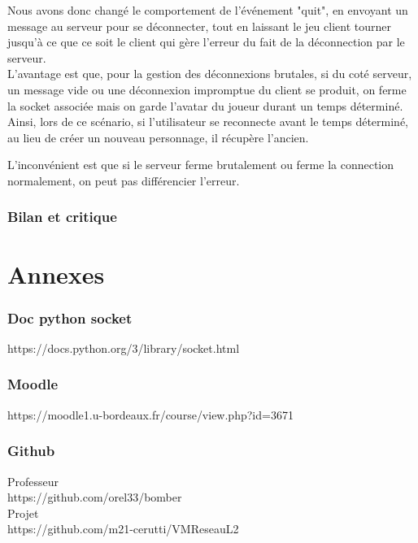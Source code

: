 \documentclass[a4paper]{article}
\begin{document}
		Nous avons donc changé le comportement de l'événement "quit", en envoyant un message au serveur pour se déconnecter, tout en laissant le jeu client tourner jusqu'à ce que ce soit le client qui gère l'erreur du fait de la déconnection par le serveur.
		\\
		L'avantage est que, pour la gestion des déconnexions brutales, si du coté serveur, un message vide ou une déconnexion impromptue du client se produit, on ferme la socket associée mais on garde l'avatar du joueur durant un temps déterminé. Ainsi, lors de ce scénario, si l'utilisateur se reconnecte avant le temps déterminé, au lieu de créer un nouveau personnage, il récupère l'ancien.

		L'inconvénient est que si le serveur ferme brutalement ou ferme la connection normalement, on peut pas différencier l'erreur.


	\section{Bilan et critique}

\newpage
\appendix
\part{Annexes}

\section{Doc python socket} \label{docpysoc}

https://docs.python.org/3/library/socket.html

\section{Moodle} \label{moodle}

https://moodle1.u-bordeaux.fr/course/view.php?id=3671

\section{Github} \label{github}

Professeur
\\
https://github.com/orel33/bomber
\\

Projet
\\
https://github.com/m21-cerutti/VM\textunderscore Reseau\textunderscore L2
\\
\end{document}
